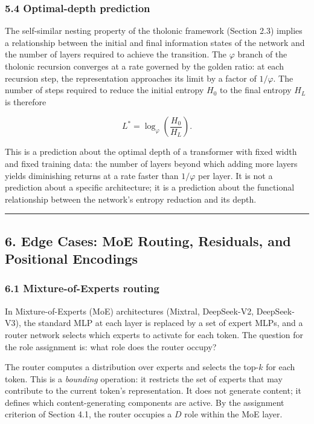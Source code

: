 \documentclass[
  11pt,
  letterpaper,
]{article}
\begin{document}
\subsubsection{5.4 Optimal-depth
prediction}\label{optimal-depth-prediction}

The self-similar nesting property of the tholonic framework (Section
2.3) implies a relationship between the initial and final information
states of the network and the number of layers required to achieve the
transition. The \(\varphi\) branch of the tholonic recursion converges
at a rate governed by the golden ratio: at each recursion step, the
representation approaches its limit by a factor of \(1/\varphi\). The
number of steps required to reduce the initial entropy \(H_0\) to the
final entropy \(H_L\) is therefore

\[L^* = \log_\varphi\!\left(\frac{H_0}{H_L}\right).\]

This is a prediction about the optimal depth of a transformer with fixed
width and fixed training data: the number of layers beyond which adding
more layers yields diminishing returns at a rate faster than
\(1/\varphi\) per layer. It is not a prediction about a specific
architecture; it is a prediction about the functional relationship
between the network's entropy reduction and its depth.

\begin{center}\rule{0.5\linewidth}{0.5pt}\end{center}

\subsection{6. Edge Cases: MoE Routing, Residuals, and Positional
Encodings}\label{edge-cases-moe-routing-residuals-and-positional-encodings}

\subsubsection{6.1 Mixture-of-Experts
routing}\label{mixture-of-experts-routing}

In Mixture-of-Experts (MoE) architectures (Mixtral, DeepSeek-V2,
DeepSeek-V3), the standard MLP at each layer is replaced by a set of
expert MLPs, and a router network selects which experts to activate for
each token. The question for the role assignment is: what role does the
router occupy?

The router computes a distribution over experts and selects the
top-\(k\) for each token. This is a \emph{bounding} operation: it
restricts the set of experts that may contribute to the current token's
representation. It does not generate content; it defines which
content-generating components are active. By the assignment criterion of
Section 4.1, the router occupies a \(D\) role within the MoE layer.
\end{document}
